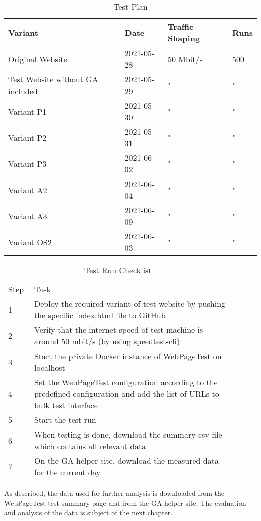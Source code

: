 \begin{table}[h]
	\small
	\centering
	\begin{tabular}{ | l | l | l | l | } 
	 \hline
	  Variant \cellcolor{lightgrey} &  Date \cellcolor{lightgrey} & Traffic Shaping \cellcolor{lightgrey} & Runs \cellcolor{lightgrey} \\
	  \hline
	  Original Website & 2021-05-28 & 50 Mbit/s & 500 \\
	  Test Website without GA included & 2021-05-29 & " & " \\
	  \hline
	  Variant P1 & 2021-05-30 & " & " \\
	  Variant P2 & 2021-05-31 & " & " \\
	  Variant P3 & 2021-06-02 & " & " \\
	  \hline
	  Variant A2 & 2021-06-04 & " & " \\
	  Variant A3 & 2021-06-09 & " & " \\
	  \hline
	  Variant OS2 & 2021-06-03 & " & " \\
	  \hline
	  \end{tabular}
	\medskip
	\caption{Test Plan}
	\label{table:test_plan}
\end{table}


\begin{table}[h]
	\small
	\centering
	\begin{tabular}{ | p{0.1\linewidth} | p{0.8\linewidth} | } 
	\hline
	Step \cellcolor{lightgrey} & Task \cellcolor{lightgrey} \\
	1 & Deploy the required variant of test website by pushing the specific index.html file to GitHub \\
	2 & Verify that the internet speed of test machine is around 50 mbit/s (by using speedtest-cli) \\
	3 & Start the private Docker instance of WebPageTest on localhost \\
	4 & Set the WebPageTest configuration according to the predefined configuration and add the list of URLs to bulk test interface \\
	5 & Start the test run \\
	6 & When testing is done, download the summary csv file which contains all relevant data \\
	7 & On the GA helper site, download the measured data for the current day \\
	\hline
	\end{tabular}
	\medskip
	\caption{Test Run Checklist}
	\label{table:test_run_checklist}
\end{table}


As described, the data used for further analysis is downloaded from the WebPageTest test summary page and from the GA helper site.
The evaluation and analysis of the data is subject of the next chapter.